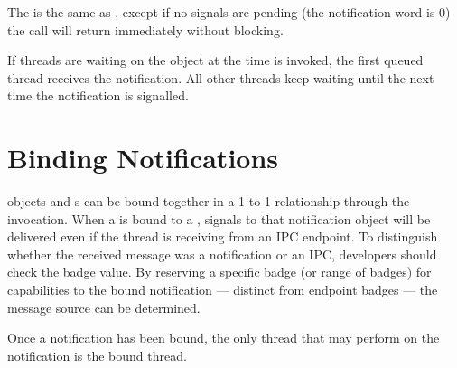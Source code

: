 The  is the same as , except if
no signals are pending (the notification word is 0) the call will return immediately
without blocking.

If threads are waiting on the  object at the time
 is invoked, the first queued thread
receives the notification. All other threads keep waiting until the
next time the notification is signalled.

\section{Binding Notifications}
\label{sec:notification-binding}

 objects and s can be bound together in a 1-to-1 relationship
through the  invocation. When a
 is bound to a , signals to that notification object
will be delivered even if the thread is receiving from an IPC
endpoint. To distinguish whether the received message was a notification
or an IPC, developers should check the badge value. By reserving a
specific badge (or range of badges) for capabilities to the bound
notification --- distinct from endpoint badges --- the
message source can be determined.

Once a notification has been bound, the only thread that may perform
 on the notification is the bound thread.
